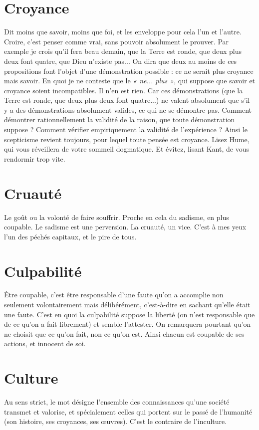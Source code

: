 \section{Croyance}
Dit moins que savoir, moins que foi, et les enveloppe pour
cela l’un et l’autre. Croire, c’est penser comme vrai, sans pouvoir
absolument le prouver. Par exemple je crois qu’il fera beau demain, que la
Terre est ronde, que deux plus deux font quatre, que Dieu n’existe pas... On
dira que deux au moins de ces propositions font l’objet d’une démonstration
possible : ce ne serait plus croyance mais savoir. En quoi je ne conteste que le
{\it « ne... plus »}, qui suppose que savoir et croyance soient incompatibles. Il n’en
est rien. Car ces démonstrations (que la Terre est ronde, que deux plus deux
font quatre...) ne valent absolument que s’il y a des démonstrations absolument
valides, ce qui ne se démontre pas. Comment démontrer rationnellement
la validité de la raison, que toute démonstration suppose ? Comment vérifier
empiriquement la validité de l’expérience ? Ainsi le scepticisme revient toujours,
pour lequel toute pensée est croyance. Lisez Hume, qui vous réveillera de
votre sommeil dogmatique. Et évitez, lisant Kant, de vous rendormir trop
vite.

\section{Cruauté}
Le goût ou la volonté de faire souffrir. Proche en cela du
sadisme, en plus coupable. Le sadisme est une perversion. La
cruauté, un vice. C’est à mes yeux l’un des péchés capitaux, et le pire de tous.

\section{Culpabilité}
Être coupable, c’est être responsable d’une faute qu’on a
accomplie non seulement volontairement mais délibérément,
c’est-à-dire en sachant qu’elle était une faute. C’est en quoi la culpabilité
suppose la liberté (on n’est responsable que de ce qu’on a fait librement) et
semble l’attester. On remarquera pourtant qu’on ne choisit que ce qu’on fait,
non ce qu’on est. Ainsi chacun est coupable de ses actions, et innocent de soi.

\section{Culture}
Au sens strict, le mot désigne l’ensemble des connaissances
qu’une société transmet et valorise, et spécialement celles qui
portent sur le passé de l'humanité (son histoire, ses croyances, ses œuvres).
C’est le contraire de l’inculture.

